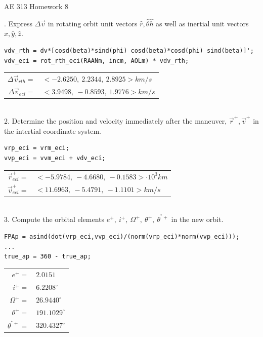 \documentclass[hidelinks,12pt]{article}
\begin{document}

\begin{center}
\large AE 313 Homework 8
\end{center}
. Express $\Delta \vec{v}$ in rotating orbit unit vectors $\hat{r}, \hat{\theta} \hat{h}$ as well as inertial unit vectors $\hat{x}, \hat{y}, \hat{z}$.\\
\begin{lstlisting}[frame=lines,style=Matlab-editor,basicstyle = \mlttfamily]
vdv_rth = dv*[cosd(beta)*sind(phi) cosd(beta)*cosd(phi) sind(beta)]';
vdv_eci = rot_rth_eci(RAANm, incm, AOLm) * vdv_rth;
\end{lstlisting}
\begin{tabular}{rl}
  $\Delta \vec{v}_{rth}=$&$<-2.6250,~2.2344,~2.8925> km/s$\\
  $\Delta \vec{v}_{eci}=$&$<3.9498,~-0.8593,~1.9776> km/s$
\end{tabular}\\
\vspace{10px}
2. Determine the position and velocity immediately after the maneuver, $\vec{r}^+, \vec{v}^+$ in the intertial coordinate system.\\
\begin{lstlisting}[frame=lines,style=Matlab-editor,basicstyle = \mlttfamily]
vrp_eci = vrm_eci;
vvp_eci = vvm_eci + vdv_eci;
\end{lstlisting}
\begin{tabular}{rl}
  $\vec{r}^+_{eci}=$&$<-5.9784,~-4.6680,~-0.1583> \cdot 10^3 km$\\
  $\vec{v}^+_{eci}=$&$<11.6963,~-5.4791,~-1.1101> km/s$
\end{tabular}\\
\vspace{10px}
3. Compute the orbital elements $e^+,~i^+,~\Omega^+,~\theta^+,~\theta^{^*+}$ in the new orbit.\\
\begin{lstlisting}[frame=lines,style=Matlab-editor,basicstyle = \mlttfamily]
FPAp = asind(dot(vrp_eci,vvp_eci)/(norm(vrp_eci)*norm(vvp_eci)));
...
true_ap = 360 - true_ap;
\end{lstlisting}
\begin{tabular}{rl}
  $e^+=$ & $2.0151$\\
  $i^+=$ & $6.2208^\circ$\\
  $\Omega^+=$ & $26.9440^\circ$\\
  $\theta^+=$ & $191.1029^\circ$\\
  $\theta^{^*+}=$ & $320.4327^\circ$\\
\end{tabular}\\
\end{document}

